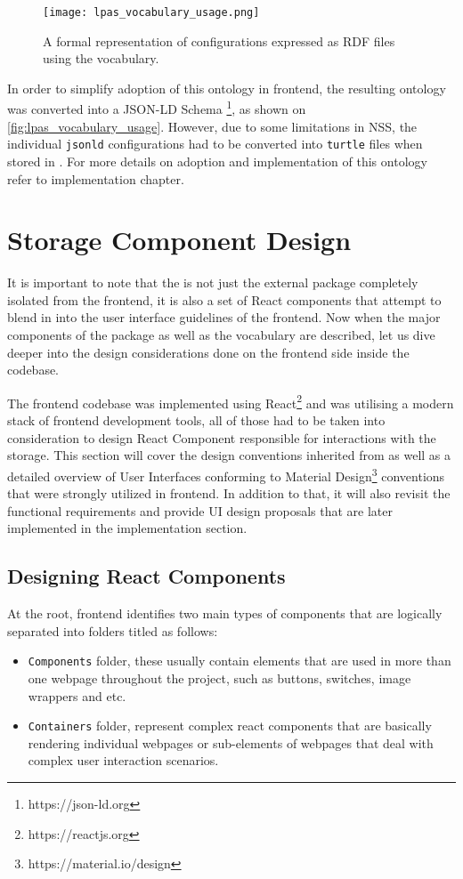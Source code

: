 \begin{figure}[h]
\centering
\texttt{[image: lpas\_vocabulary\_usage.png]}
\caption{A formal representation of \lpa{} configurations expressed as RDF files using the \lpas{} vocabulary.}
\label{fig:lpas_vocabulary_usage}
\end{figure}

In order to simplify adoption of this ontology in \lpa{} frontend, the resulting ontology was converted into a JSON-LD Schema \footnote{https://json-ld.org}, as shown on \autoref{fig:lpas_vocabulary_usage}. However, due to some limitations in NSS, the individual \texttt{jsonld} configurations had to be converted into \texttt{turtle} files when stored in \solid{}. For more details on adoption and  implementation of this ontology refer to implementation chapter.


\section{Storage Component Design}

It is important to note that the \lpas{} is not just the external package completely isolated from the \lpa{} frontend, it is also a set of React components that attempt to blend in into the user interface guidelines of the frontend. Now when the major components of the \lpas{} package as well as the \lpas{} vocabulary are described, let us dive deeper into the design considerations done on the frontend side inside the \lpa{} codebase. 

The \lpa{} frontend codebase was implemented using React\footnote{https://reactjs.org} and was utilising a modern stack of frontend development tools, all of those had to be taken into consideration to design React Component responsible for interactions with the storage. This section will cover the design conventions inherited from \lpa{} as well as a detailed overview of User Interfaces conforming to Material Design\footnote{https://material.io/design} conventions that were strongly utilized in \lpa{} frontend. In addition to that, it will also revisit the functional requirements and provide UI design proposals that are later implemented in the implementation section.

\subsection{Designing React Components}

At the root, \lpa{} frontend identifies two main types of components that are logically separated into folders titled as follows:
\begin{itemize}
	\item \texttt{Components} folder, these usually contain elements that are used in more than one webpage throughout the project, such as buttons, switches, image wrappers and etc.
	\item \texttt{Containers} folder, represent complex react components that are basically rendering individual webpages or sub-elements of webpages that deal with complex user interaction scenarios.
\end{itemize}

